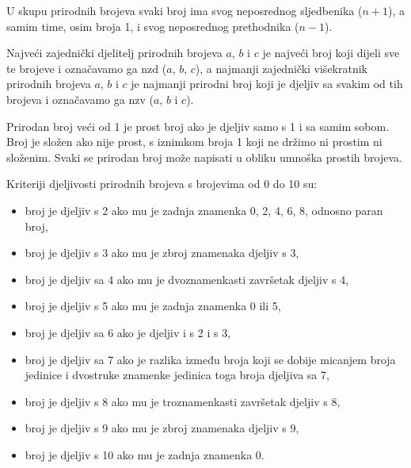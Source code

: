 U skupu prirodnih brojeva svaki broj ima svog neposrednog sljedbenika ($n+1$), a samim time, osim broja 1, i svog neposrednog prethodnika ($n-1$).

Najveći zajednički djelitelj prirodnih brojeva $a$, $b$ i $c$ je najveći broj koji dijeli sve te brojeve i označavamo ga nzd ($a$, $b$, $c$), a najmanji zajednički višekratnik prirodnih brojeva $a$, $b$ i $c$ je najmanji prirodni broj koji je djeljiv sa svakim od tih brojeva i označavamo ga nzv ($a$, $b$ i $c$).

Prirodan broj veći od 1 je prost broj ako je djeljiv samo s 1 i sa samim sobom.
Broj je složen ako nije prost, s iznimkom broja 1 koji ne držimo ni prostim ni složenim.
Svaki se prirodan broj može napisati u obliku umnoška prostih brojeva.

Kriteriji djeljivosti prirodnih brojeva s brojevima od 0 do 10 su:
\begin{itemize}
  \item broj je djeljiv s 2 ako mu je zadnja znamenka 0, 2, 4, 6, 8, odnosno paran broj,
  \item broj je djeljiv s 3 ako mu je zbroj znamenaka djeljiv s 3,
  \item broj je djeljiv sa 4 ako mu je dvoznamenkasti završetak djeljiv s 4,
  \item broj je djeljiv s 5 ako mu je zadnja znamenka 0 ili 5,
  \item broj je djeljiv sa 6 ako je djeljiv i s 2 i s 3,
  \item broj je djeljiv sa 7 ako je razlika između broja koji se dobije micanjem broja jedinice i dvostruke znamenke jedinica toga broja djeljiva sa 7,
  \item broj je djeljiv s 8 ako mu je troznamenkasti završetak djeljiv s 8,
  \item broj je djeljiv s 9 ako mu je zbroj znamenaka djeljiv s 9,
  \item broj je djeljiv s 10 ako mu je zadnja znamenka 0.
\end{itemize}
